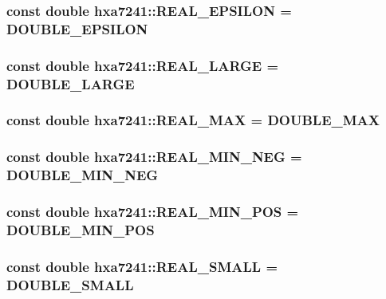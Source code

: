 \subsubsection{\setlength{\rightskip}{0pt plus 5cm}const double {\bf hxa7241::REAL\_\-EPSILON} = {\bf DOUBLE\_\-EPSILON}}\label{namespacehxa7241_e6f0fc0eacc944c6869a65e0328c386e}


\subsubsection{\setlength{\rightskip}{0pt plus 5cm}const double {\bf hxa7241::REAL\_\-LARGE} = {\bf DOUBLE\_\-LARGE}}\label{namespacehxa7241_2b48c7e1783ee552f43c4f8839c95ced}


\subsubsection{\setlength{\rightskip}{0pt plus 5cm}const double {\bf hxa7241::REAL\_\-MAX} = {\bf DOUBLE\_\-MAX}}\label{namespacehxa7241_380c050c11695752ff7b39f3805a3868}


\subsubsection{\setlength{\rightskip}{0pt plus 5cm}const double {\bf hxa7241::REAL\_\-MIN\_\-NEG} = {\bf DOUBLE\_\-MIN\_\-NEG}}\label{namespacehxa7241_9adfd9003355ed1cf3a89e4d6971c5e1}


\subsubsection{\setlength{\rightskip}{0pt plus 5cm}const double {\bf hxa7241::REAL\_\-MIN\_\-POS} = {\bf DOUBLE\_\-MIN\_\-POS}}\label{namespacehxa7241_b525ac3ca9aeca68c69a5b672398589b}


\subsubsection{\setlength{\rightskip}{0pt plus 5cm}const double {\bf hxa7241::REAL\_\-SMALL} = {\bf DOUBLE\_\-SMALL}}\label{namespacehxa7241_3acdce9acb0aa49597564e9a4250cc47}


